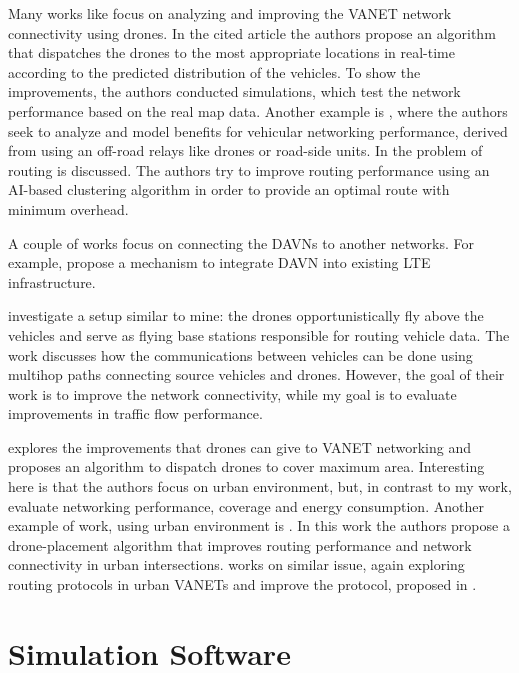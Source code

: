 \documentclass[]{nsm-thesis}
\begin{document}
Many works like \textcite{lin2020novel} focus on analyzing and improving the \ac{VANET} network connectivity using drones. In the cited article the authors propose an algorithm that dispatches the drones to the most appropriate locations in real-time according to the predicted distribution of the vehicles. To show the improvements, the authors conducted simulations, which test the network performance based on the real map data. Another example is \textcite{khabbaz2019modeling}, where the authors seek to analyze and model benefits for vehicular networking performance, derived from using an off-road relays like drones or road-side units. In \textcite{tariq2020imoc} the problem of routing is discussed. The authors try to improve routing performance using an AI-based clustering algorithm in order to provide an optimal route with minimum overhead.

A couple of works focus on connecting the \acp{DAVN} to another networks. For example, \textcite{saputro2018security} propose a mechanism to integrate \ac{DAVN} into existing LTE infrastructure.

\textcite{Khabbaz2021Multihop} investigate a setup similar to mine: the drones opportunistically fly above the vehicles and serve as flying base stations responsible for routing vehicle data. The work discusses how the communications between vehicles can be done using multihop paths connecting source vehicles and drones. However, the goal of their work is to improve the network connectivity, while my goal is to evaluate improvements in traffic flow performance.

\textcite{Oubbati2021Dispatch} explores the improvements that drones can give to \ac{VANET} networking and proposes an algorithm to dispatch drones to cover maximum area. Interesting here is that the authors focus on urban environment, but, in contrast to my work, evaluate networking performance, coverage and energy consumption. Another example of work, using urban environment is \textcite{Oubbati2016intersection}. In this work the authors propose a drone-placement algorithm that improves routing performance and network connectivity in urban intersections. \textcite{OUBBATI201793} works on similar issue, again exploring routing protocols in urban \acp{VANET} and improve the protocol, proposed in \cite{Oubbati2016intersection}.

\section {Simulation Software}
\end{document}
